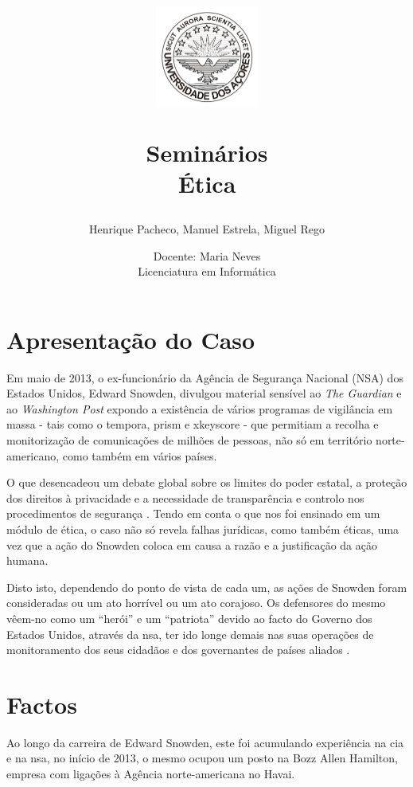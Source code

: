 \documentclass[a4paper,12pt]{article}
\title{
    \vspace{-1cm} 
    \begin{figure}[H]
        \centering
        \includegraphics[width=0.3\textwidth]{./images/uac_logo.png}
    \end{figure}
    \vspace{0.5cm} 
    \textbf{Seminários}
    \\
    Ética
}
\author{Henrique Pacheco, Manuel Estrela, Miguel Rego}
\date{Docente: Maria Neves \\ \vspace{0.5cm}Licenciatura em Informática }
\begin{document}
\maketitle

\begin{abstract}
\end{abstract}

\newpage
\tableofcontents

\newpage

\section{Apresentação do Caso}

Em maio de 2013, o ex-funcionário da Agência de Segurança Nacional (NSA) dos Estados Unidos, Edward Snowden, divulgou material sensível ao \textit{The Guardian} e ao \textit{Washington Post} expondo a existência de vários programas de vigilância em massa - tais como o \gls{tempora}, \gls{prism} e \gls{xkeyscore} - que permitiam a recolha e monitorização de comunicações de milhões de pessoas, não só em território norte-americano, como também em vários países.


O que desencadeou um debate global sobre os limites do poder estatal, a proteção dos direitos à privacidade e a necessidade de transparência e controlo nos procedimentos de segurança \cite{teresa}.
Tendo em conta o que nos foi ensinado em um módulo de ética, o caso não só revela falhas jurídicas, como também éticas, uma vez que a ação do Snowden coloca em causa a razão e a justificação da ação humana. 

Disto isto, dependendo do ponto de vista de cada um, as ações de Snowden foram consideradas ou um ato horrível ou um ato corajoso. Os defensores do mesmo vêem-no como um “herói” e um “patriota” devido ao facto do Governo dos Estados Unidos, através da \acrshort{nsa}, ter ido longe demais nas suas operações de monitoramento dos seus cidadãos e dos governantes de países aliados \cite{tavani}. 

\section{Factos}


Ao longo da carreira de Edward Snowden, este foi acumulando experiência na \acrshort{cia} e na \acrshort{nsa}, no início de 2013, o mesmo ocupou um posto na Bozz Allen Hamilton, empresa com ligações à Agência norte-americana no Havai.
\end{document}
